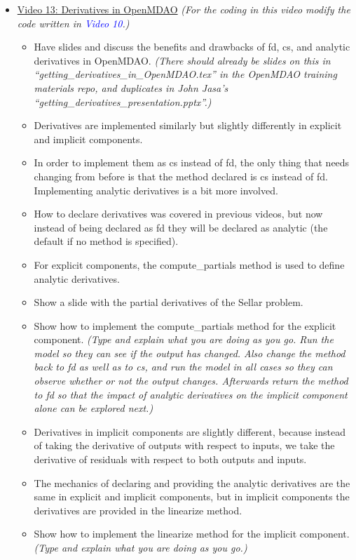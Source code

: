 \documentclass[12pt, letterpaper]{article}
\begin{document}
\begin{itemize}
	\item \underline{Video 13: Derivatives in OpenMDAO} \textit{(For the coding in this video modify the code written in \textcolor{blue}{Video 10}.)}
		\begin{itemize}
			\item Have slides and discuss the benefits and drawbacks of fd, cs, and analytic derivatives in OpenMDAO. \textit{(There should already be slides on this in “getting\_derivatives\_in\_OpenMDAO.tex” in the OpenMDAO training materials repo, and duplicates in John Jasa’s “getting\_derivatives\_presentation.pptx”.)}
			\item Derivatives are implemented similarly but slightly differently in explicit and implicit components. 
			\item In order to implement them as cs instead of fd, the only thing that needs changing from before is that the method declared is cs instead of fd. Implementing analytic derivatives is a bit more involved.
			\item How to declare derivatives was covered in previous videos, but now instead of being declared as fd they will be declared as analytic (the default if no method is specified).
			\item For explicit components, the compute\_partials method is used to define analytic derivatives. 
			\item Show a slide with the partial derivatives of the Sellar problem.
			\item Show how to implement the compute\_partials method for the explicit component. \textit{(Type and explain what you are doing as you go. Run the model so they can see if the output has changed. Also change the method back to fd as well as to cs, and run the model in all cases so they can observe whether or not the output changes. Afterwards return the method to fd so that the impact of analytic derivatives on the implicit component alone can be explored next.)}
			\item Derivatives in implicit components are slightly different, because instead of taking the derivative of outputs with respect to inputs, we take the derivative of residuals with respect to both outputs and inputs.
			\item The mechanics of declaring and providing the analytic derivatives are the same in explicit and implicit components, but in implicit components the derivatives are provided in the linearize method.
			\item Show how to implement the linearize method for the implicit component. \textit{(Type and explain what you are doing as you go.)}

\end{itemize}
\end{itemize}
\end{document}
